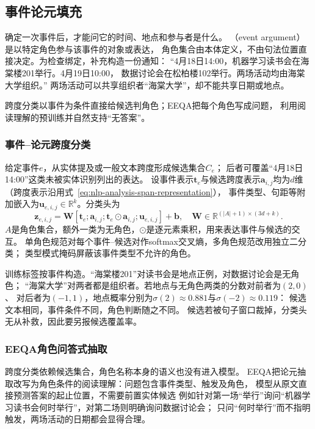\subsection{事件论元填充}
\label{sec:nlp-extraction-arguments}

确定一次事件后，才能问它的时间、地点和参与者是什么。
（event argument）是以特定角色参与该事件的对象或表达，
角色集合由本体定义，不由句法位置直接决定。为检查绑定，补充构造一份通知：
“4月18日14:00，机器学习读书会在海棠楼201举行。4月19日10:00，
数据讨论会在松柏楼102举行。两场活动均由海棠大学组织。”
两场活动可以共享组织者“海棠大学”，却不能共享日期或地点。

跨度分类以事件为条件直接给候选判角色；EEQA把每个角色写成问题，
利用阅读理解的预训练并自然支持“无答案”。

\subsubsection{事件--论元跨度分类}
\label{sec:nlp-extraction-argument-spans}

给定事件$e$，从实体提及或一般文本跨度形成候选集合$C_e$；
后者可覆盖“4月18日14:00”这类未被实体识别列出的表达。
设事件表示$\bm{t}_e$与候选跨度表示$\bm{a}_{i,j}$均为$d$维
（跨度表示沿用式~\eqref{eq:nlp-analysis-span-representation}），
事件类型、句距等附加嵌入为$\bm{u}_{e,i,j}\in\mathbb{R}^{k}$。分类头为
\begin{equation}
  \bm{z}_{e,i,j}
  =\bm{W}[\bm{t}_e;\bm{a}_{i,j};
             \bm{t}_e\odot\bm{a}_{i,j};\bm{u}_{e,i,j}]+\bm{b},
  \quad \bm{W}\in\mathbb{R}^{(|A|+1)\times(3d+k)}.
  \label{eq:nlp-extraction-argument-spans}
\end{equation}
$A$是角色集合，额外一类为无角色，$\odot$是逐元素乘积，用来表达事件与候选的交互。
单角色规范对每个事件--候选对作softmax交叉熵，多角色规范改用独立二分类；
类型模式掩码屏蔽该事件类型不允许的角色。

训练标签按事件构造。“海棠楼201”对读书会是地点正例，对数据讨论会是无角色；
“海棠大学”对两者都是组织者。若地点与无角色两类的分数对前者为$(2,0)$、
对后者为$(-1,1)$，地点概率分别为$\sigma(2)\approx0.881$与$\sigma(-2)\approx0.119$：
候选文本相同，事件条件不同，角色判断随之不同。
候选若被句子窗口裁掉，分类头无从补救，因此要另报候选覆盖率。

\subsubsection{EEQA角色问答式抽取}
\label{sec:nlp-extraction-eeqa}

跨度分类依赖候选集合，角色名称本身的语义也没有进入模型。
EEQA把论元抽取改写为角色条件的阅读理解：问题包含事件类型、触发及角色，
模型从原文直接预测答案的起止位置，不需要前置实体候选
例如针对第一场“举行”询问“机器学习读书会何时举行”，对第二场则明确询问数据讨论会；
只问“何时举行”而不指明触发，两场活动的日期都会显得合理。

